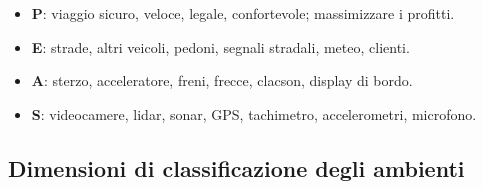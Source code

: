 \begin{exbox}
\begin{itemize}
    \item \textbf{P}: viaggio sicuro, veloce, legale, confortevole; massimizzare i profitti.
    \item \textbf{E}: strade, altri veicoli, pedoni, segnali stradali, meteo, clienti.
    \item \textbf{A}: sterzo, acceleratore, freni, frecce, clacson, display di bordo.
    \item \textbf{S}: videocamere, lidar, sonar, GPS, tachimetro, accelerometri, microfono.
\end{itemize}
\end{exbox}


\subsection{Dimensioni di classificazione degli ambienti}
